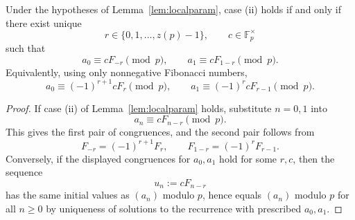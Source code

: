 \begin{corollary}\label{cor:localinitial}
Under the hypotheses of Lemma~\ref{lem:localparam}, case \textup{(ii)} holds if and only if there exist unique
\[
r\in\{0,1,\dots,z(p)-1\},\qquad c\in \mathbb F_p^{\times}
\]
such that
\[
a_0\equiv cF_{-r}\pmod p,
\qquad
 a_1\equiv cF_{1-r}\pmod p.
\]
Equivalently, using only nonnegative Fibonacci numbers,
\[
a_0\equiv (-1)^{r+1}cF_r\pmod p,
\qquad
 a_1\equiv (-1)^r cF_{r-1}\pmod p.
\]
\end{corollary}
\begin{proof}
If case (ii) of Lemma~\ref{lem:localparam} holds, substitute $n=0,1$ into
\[
a_n\equiv cF_{n-r}\pmod p.
\]
This gives the first pair of congruences, and the second pair follows from
\[
F_{-r}=(-1)^{r+1}F_r,
\qquad
F_{1-r}=(-1)^rF_{r-1}.
\]
Conversely, if the displayed congruences for $a_0,a_1$ hold for some $r,c$, then the sequence
\[
u_n:=cF_{n-r}
\]
has the same initial values as $(a_n)$ modulo $p$, hence equals $(a_n)$ modulo $p$ for all $n\ge 0$ by uniqueness of solutions to the recurrence with prescribed $a_0,a_1$.
\end{proof}

